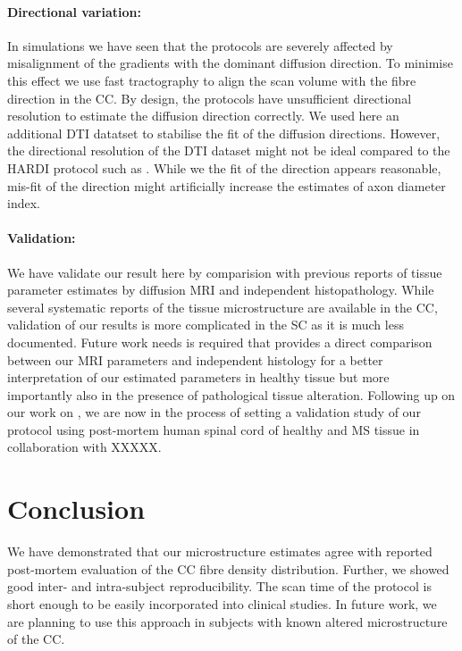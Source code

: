 \paragraph{Directional variation: } In simulations we have seen that the \SF{} protocols are severely affected by misalignment of the gradients with the dominant diffusion direction. To minimise this effect we use fast tractography to align the scan volume with the fibre direction in the CC. By design, the \SF{} protocols have unsufficient directional resolution to estimate the diffusion direction correctly. We used here an additional DTI datatset to stabilise the fit of the diffusion directions. However, the directional resolution of the DTI dataset might not be ideal compared to the HARDI protocol such as \OI. While we the fit of the direction appears reasonable, mis-fit of the direction might artificially increase the estimates of axon diameter index. 

\paragraph{Validation: } We have validate our result here by comparision with previous reports of tissue parameter estimates by diffusion MRI and independent histopathology. While several systematic reports of the tissue microstructure are available in the CC, validation of our results is more complicated in the SC as it is much less documented. Future work needs is required that provides a direct comparison between our MRI parameters and independent histology for a better interpretation of our estimated parameters in healthy tissue but more importantly also in the presence of pathological tissue alteration. Following up on our work on \SFasym{}, we are now in the process of setting a validation study of our protocol using post-mortem human spinal cord of healthy and MS tissue in collaboration with XXXXX.


\section{Conclusion}
We have demonstrated that our microstructure estimates agree with reported post-mortem evaluation of the CC fibre density distribution. Further, we showed good inter- and intra-subject reproducibility. The scan time of the protocol is short enough to be easily incorporated into clinical studies. In future work, we are planning to use this approach in subjects with known altered microstructure of the CC.